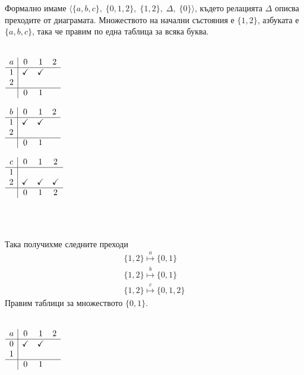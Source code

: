 \documentclass[12pt]{article}
\begin{document}
Формално имаме \(\langle \{a, b, c\},\; \{0, 1, 2\},\; \{1, 2\},\; \Delta,\; \{0\} \rangle\),
където релацията \(\Delta\) описва преходите от диаграмата.
Множеството на начални състояния е \(\{1, 2\}\), азбуката е \(\{a, b, c\}\),
така че правим по една таблица за всяка буква.
\\
\vspace*{5mm}
\\
\begin{minipage}{.33\textwidth}
\centering
\(\begin{array}{c|ccc}
a & 0 & 1 & 2 \\ \hline
1 & \checkmark & \checkmark & \\
2 &  &  & \\ \hline
  & 0 & 1 &
\end{array}\)
\end{minipage}
\begin{minipage}{.33\textwidth}
\centering
\(\begin{array}{c|ccc}
b & 0 & 1 & 2 \\ \hline
1 & \checkmark & \checkmark & \\
2 &  &  & \\ \hline
  & 0 & 1 & 
\end{array}\)
\end{minipage}
\begin{minipage}{.33\textwidth}
\centering
\(\begin{array}{c|ccc}
c & 0 & 1 & 2 \\ \hline
1 &  &  & \\
2 & \checkmark & \checkmark  & \checkmark \\ \hline
  & 0 & 1 & 2
\end{array}\)
\end{minipage}
\\
\vspace*{5mm}
\\\par
Така получихме следните преходи
\begin{align*}
    \{1, 2\} \overset{a}{\longmapsto} \{0, 1\} \\
    \{1, 2\} \overset{b}{\longmapsto} \{0, 1\} \\
    \{1, 2\} \overset{c}{\longmapsto} \{0, 1, 2\}
\end{align*}
Правим таблици за множеството \(\{0, 1\}\).
\\
\vspace*{5mm}
\\
\begin{minipage}{.33\textwidth}
\centering
\(\begin{array}{c|ccc}
a & 0 & 1 & 2 \\ \hline
0 & \checkmark & \checkmark & \\
1 &  &  & \\ \hline
  & 0 & 1 &
\end{array}\)
\end{minipage}
\end{document}
